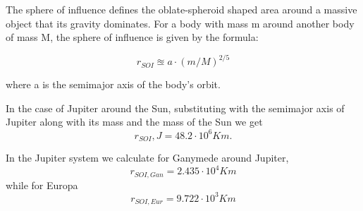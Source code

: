 \label{app:sphere_of_infl}  
The sphere of influence defines the oblate-spheroid shaped area around a massive object that its gravity dominates. For a body with mass m around another body of mass M, the sphere of influence is given by the formula:

\begin{equation}
r_{SOI} \approxeq a\cdot (m/M)^{2/5}
\end{equation}

where a is the semimajor axis of the body's orbit.

In the case of Jupiter around the Sun, substituting with the semimajor axis of Jupiter along with its mass and the mass of the Sun we get 
\begin{equation}
r_{SOI},J=48.2\cdot 10^6 Km.     
\end{equation}

In the Jupiter system we calculate for Ganymede around Jupiter,
\begin{equation}
r_{SOI,Gan}=2.435\cdot 10^4 Km    
\end{equation}
while for Europa 
\begin{equation}
r_{SOI,Eur}=9.722\cdot 10^3 Km    
\end{equation}
 